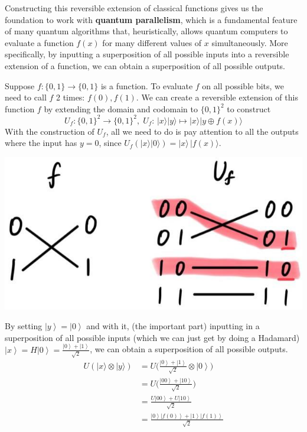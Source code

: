 \documentclass{article}
\newcommand{\ket}[1]{\ensuremath{\left|#1\right\rangle}}
\begin{document}
      Constructing this reversible extension of classical functions gives us the foundation to work with \textbf{quantum parallelism}, which is a fundamental feature of many quantum algorithms that, heuristically, allows quantum computers to evaluate a function $f(x)$ for many different values of $x$ simultaneously. More specifically, by inputting a superposition of all possible inputs into a reversible extension of a function, we can obtain a superposition of all possible outputs. 

      \begin{example}
        Suppose $f: \{0, 1\} \longrightarrow \{0, 1\}$ is a function. To evaluate $f$ on all possible bits, we need to call $f$ 2 times: $f(0), f(1)$. We can create a reversible extension of this function $f$ by extending the domain and codomain to $\{0, 1\}^2$ to construct
        \begin{equation} 
          U_f: \{0, 1\}^2 \longrightarrow \{0, 1\}^2, \; U_f: \, |x \rangle |y\rangle \mapsto |x\rangle |y \oplus f(x) \rangle
        \end{equation}
        With the construction of $U_f$, all we need to do is pay attention to all the outputs where the input has $y=0$, since $U_f (|x \rangle |0\rangle) = |x \rangle \, |f(x) \rangle$.
        \begin{center}
          \includegraphics[scale=0.3]{img/f_to_U_one_qubit_reversible.jpg}
        \end{center}
        By setting $\ket{y} = \ket{0}$ and with it, (the important part) inputting in a superposition of all possible inputs (which we can just get by doing a Hadamard) $\ket{x} = H \ket{0} = \frac{\ket{0} + \ket{1}}{\sqrt{2}}$, we can obtain a superposition of all possible outputs.
        \begin{align*}
          U (|x\rangle \otimes |y\rangle) & = U \bigg(\frac{\ket{0} + \ket{1}}{\sqrt{2}} \otimes \ket{0} \bigg) \\ 
                                          & = U \bigg( \frac{\ket{00} + \ket{10}}{\sqrt{2}} \bigg) \\ 
                                          & = \frac{U \ket{00} + U \ket{10}}{\sqrt{2}} \\ 
                                          & = \frac{\ket{0} \ket{f(0)} + \ket{1} \ket{f(1)}}{\sqrt{2}}
        \end{align*}


\end{example}
\end{document}
